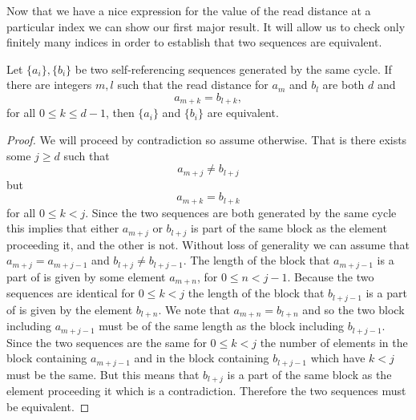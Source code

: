\documentclass[runningheads,a4paper]{llncs}
\begin{document}
Now that we have a nice expression for the value of the read distance at a particular index we can show our first major result. It will allow us to check only finitely many indices in order to establish that two sequences are equivalent. 
\begin{theorem} 
\label{equivsuff}
Let $\{a_i\}, \{b_i\}$ be two self-referencing sequences generated by the same cycle. If there are integers $m,l$ such that the read distance for $a_m$ and $b_l$ are both $d$ and 
\begin{equation*}
a_{m+k} = b_{l+k},
\end{equation*}
for all $0 \leq k \leq d-1$, then $\{a_i\}$ and $\{b_i\}$ are equivalent. 
\end{theorem}

\begin{proof}
We will proceed by contradiction so assume otherwise. That is there exists some $j \geq d$ such that 
\begin{equation*}
a_{m+j} \neq b_{l+j}
\end{equation*}
but 
\begin{equation*}
a_{m+k} = b_{l+k}
\end{equation*} 
for all $0 \leq k < j$. 
Since the two sequences are both generated by the same cycle this implies that either $a_{m+j}$ or $b_{l+j}$ is part of the same block as the element proceeding it, and the other is not.
Without loss of generality we can assume that $a_{m+j}=a_{m+j-1}$ and $b_{l+j} \neq b_{l+j-1}$. 
The length of the block that $a_{m+j-1}$ is a part of is given by some element $a_{m+n}$, for $0 \leq n < j-1$. Because the two sequences are identical for $0 \leq k<j$ the length of the block that $b_{l+j-1}$ is a part of is given by the element $b_{l+n}$.  
We note that $a_{m+n}=b_{l+n}$ and so the two block including $a_{m+j-1}$ must be of the same length as the block including $b_{l+j-1}$. 
Since the two sequences are the same for $0 \leq k<j$ the number of elements in the block containing $a_{m+j-1}$ and in the block containing $b_{l+j-1}$ which have $k<j$ must be the same. But this means that $b_{l+j}$ is a part of the same block as the element proceeding it which is a contradiction. 
Therefore the two sequences must be equivalent. 



\end{proof}
\end{document}
